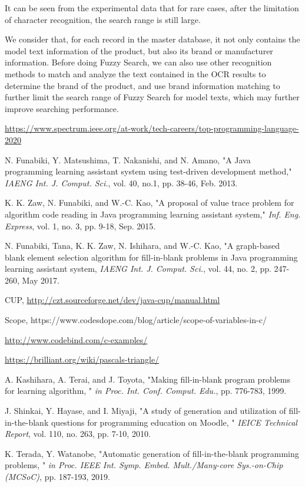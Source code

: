 \documentclass[technicalreport]{ieicej}
\begin{document}
    It can be seen from the experimental data that for rare cases, after the limitation of character recognition, the search range is still large.
    
    We consider that, for each record in the master database, it not only contains the model text information of the product, but also its brand or manufacturer information. Before doing Fuzzy Search, we can also use other recognition methods to match and analyze the text contained in the OCR results to determine the brand of the product, and use brand information matching to further limit the search range of Fuzzy Search for model texts, which may further improve searching performance.
    

%
%
\begin{thebibliography}{99}%
    \url{https://www.spectrum.ieee.org/at-work/tech-careers/top-programming-language-2020}

    N. Funabiki, Y. Matsushima, T. Nakanishi, and N. Amano, "A Java programming learning assistant system using test-driven development method," \emph{IAENG Int. J. Comput. Sci.}, vol. 40, no.1, pp. 38-46, Feb. 2013.
    
    K. K. Zaw, N. Funabiki, and W.-C. Kao, "A proposal of value trace problem for algorithm code reading in Java programming learning assistant system," \emph{Inf. Eng. Express}, vol. 1, no. 3, pp. 9-18, Sep. 2015.
    
    N. Funabiki, Tana, K. K. Zaw, N. Ishihara, and W.-C. Kao, "A graph-based blank element selection algorithm for fill-in-blank problems in Java programming learning assistant system, \emph{IAENG Int. J. Comput. Sci.}, vol. 44, no. 2, pp. 247-260, May 2017.
    
    CUP, \url{http://czt.sourceforge.net/dev/java-cup/manual.html}
    
    Scope, https://www.codesdope.com/blog/article/scope-of-variables-in-c/
    
    \url{http://www.codebind.com/c-examples/}
    
    \url{https://brilliant.org/wiki/pascals-triangle/}
    
    A. Kashihara, A. Terai, and J. Toyota, "Making fill-in-blank program problems for learning algorithm, " \emph{in Proc. Int. Conf. Comput. Edu.}, pp. 776-783, 1999.
    
    J. Shinkai, Y. Hayase, and I. Miyaji, "A study of generation and utilization of fill-in-the-blank questions for programming education on Moodle, " \emph{IEICE Technical Report}, vol. 110, no. 263, pp. 7-10, 2010.
    
    K. Terada, Y. Watanobe, "Automatic generation of fill-in-the-blank programming problems, " \emph{in Proc. IEEE Int. Symp. Embed. Mult./Many-core Sys.-on-Chip (MCSoC)}, pp. 187-193, 2019.
\end{thebibliography}
\end{document}

